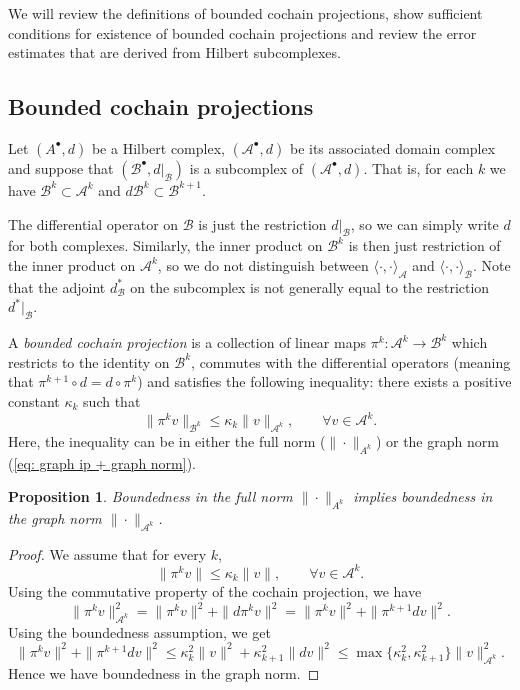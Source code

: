 \documentclass[reqno]{amsart}
\numberwithin{equation}{section}
\newtheorem{proposition}[theorem]{Proposition}
\theoremstyle{definition}
\newcommand{\Ac}{\mathcal{A}}
\newcommand{\Bc}{\mathcal{B}}
\begin{document}
We will review the definitions of bounded cochain projections, show sufficient conditions for existence of bounded cochain projections and review the error estimates that are derived from Hilbert subcomplexes.




\subsection{Bounded cochain projections}
Let $(A^\bullet, d)$ be a Hilbert complex, $(\Ac^\bullet, d)$ be its associated domain complex and suppose that $(\Bc^\bullet, d|_{\Bc})$ is a subcomplex of $(\Ac^\bullet, d)$. That is, for each $k$ we have $\Bc^k \subset \Ac^k$ and $d\Bc^k \subset \Bc^{k+1}$.

The differential operator on $\Bc$ is just the restriction $d|_{\Bc}$, so we can simply write $d$ for both complexes. Similarly, the inner product on $\Bc^k$ is then just restriction of the inner product on $\Ac^k$, so we do not distinguish between $\langle \cdot, \cdot \rangle_\Ac$ and $\langle \cdot, \cdot \rangle_{\Bc}$. Note that the adjoint $d^*_\Bc$ on the subcomplex is not generally equal to the restriction $d^*|_\Bc$.

A \emph{bounded cochain projection} is a collection of linear maps $\pi^k: \Ac^k \to \Bc^k$ which restricts to the identity on $\Bc^k$, commutes with the differential operators (meaning that $\pi^{k+1} \circ d = d \circ \pi^k$) and satisfies the following inequality: there exists a positive constant $\kappa_k$ such that
\begin{equation}\label{eq. bcp1}
\| \pi^k v \|_{\Bc^k} \leq \kappa_k \|v\|_{\Ac^k}, \qquad \forall v \in \Ac^k. 
\end{equation}
Here, the inequality can be in either the full norm ($\|\cdot\|_{A^k}$) or the graph norm (\cref{eq: graph ip + graph norm}). 

\begin{proposition}
Boundedness in the full norm $\|\cdot\|_{A^k}$ implies boundedness in the graph norm $\|\cdot\|_{\Ac^k}$.    
\end{proposition}
\begin{proof}
We assume that for every $k$,
\begin{equation}
\|\pi^k v \| \leq \kappa_k \|v\|, \qquad \forall v \in \Ac^k. 
\end{equation}
Using the commutative property of the cochain projection, we have 
\begin{equation}
\|\pi^k v\|^2_{\Ac^k} = \|\pi^k v\|^2 + \|d \pi^k v \|^2 =  \|\pi^k v\|^2 + \| \pi^{k+1} d v \|^2.
\end{equation}
Using the boundedness assumption, we get
\begin{equation}
\|\pi^k v\|^2 + \| \pi^{k+1} d v \|^2\leq \kappa^2_k \|v\|^2 + \kappa^2_{k+1} \|dv\|^2 \leq \max\{\kappa_k^2, \kappa_{k+1}^2\} \|v\|^2_{\Ac^k}.
\end{equation}
Hence we have boundedness in the graph norm.
\end{proof}
\end{document}
